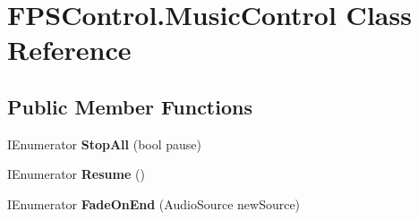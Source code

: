 \hypertarget{class_f_p_s_control_1_1_music_control}{\section{F\-P\-S\-Control.\-Music\-Control Class Reference}
\label{class_f_p_s_control_1_1_music_control}
}
\subsection*{Public Member Functions}
\begin{DoxyCompactItemize}
\item 
\hypertarget{class_f_p_s_control_1_1_music_control_a35f021c37e2d2c8e827738e6c1fa640f}{I\-Enumerator {\bfseries Stop\-All} (bool pause)}\label{class_f_p_s_control_1_1_music_control_a35f021c37e2d2c8e827738e6c1fa640f}

\item 
\hypertarget{class_f_p_s_control_1_1_music_control_a6f230d943dfd265f05455ec9350134cf}{I\-Enumerator {\bfseries Resume} ()}\label{class_f_p_s_control_1_1_music_control_a6f230d943dfd265f05455ec9350134cf}

\item 
\hypertarget{class_f_p_s_control_1_1_music_control_a47285ecf124652291045aed6802f36e3}{I\-Enumerator {\bfseries Fade\-On\-End} (Audio\-Source new\-Source)}\label{class_f_p_s_control_1_1_music_control_a47285ecf124652291045aed6802f36e3}

\end{DoxyCompactItemize}
